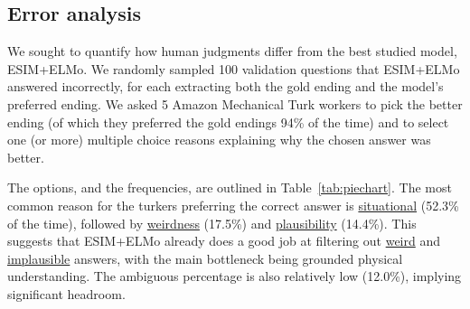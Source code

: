 \documentclass[11pt,a4paper]{article}
\begin{document}
\subsection{Error analysis}
We sought to quantify how human judgments differ from the best studied model, ESIM+ELMo. We randomly sampled 100 validation questions that ESIM+ELMo answered incorrectly, for each extracting both the gold ending and the model's preferred ending. We asked 5 Amazon Mechanical Turk workers to pick the better ending (of which they preferred the gold endings 94\% of the time) and to select one (or more) multiple choice reasons explaining why the chosen answer was better.

The options, and the frequencies, are outlined in Table~\ref{tab:piechart}. The most common reason for the turkers preferring the correct answer is \underline{situational} (52.3\% of the time), followed by \underline{weirdness} (17.5\%) and \underline{plausibility} (14.4\%). This suggests that ESIM+ELMo already does a good job at filtering out \underline{weird} and \underline{implausible} answers, with the main bottleneck being grounded physical understanding. The ambiguous percentage is also relatively low (12.0\%), implying significant headroom.
\newcommand{\aquestion}[5]{\begin{tabular}{p{0.2cm}p{6.9cm}}
\multicolumn{2}{l}{\parbox{7.0cm}{#1}} \\ 
& #2\\ 
& #3\\
& #4\\
& #5\\
\end{tabular}
}

\newcommand\mywidth{6.9cm}
\newcommand{\correctans}[1]{\textcolor{blue}{\textbf{#1}}}
\newcommand{\incans}[1]{\textcolor{red}{#1}}
\end{document}
